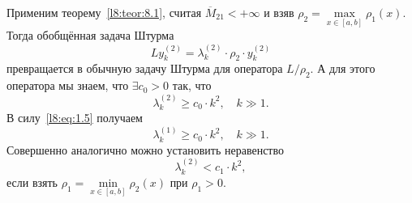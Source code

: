 Применим теорему~\ref{l8:teor:8.1}, считая $\overline{M}_{21}<+\infty$ и взяв $\rho_2=\max\limits_{x\in[a,b]}\rho_1(x)$. Тогда обобщённая задача Штурма
\begin{equation*}
	L y_k^{(2)}=\lambda_{k}^{(2)}\cdot\rho_2\cdot y_k^{(2)}
\end{equation*}
превращается в обычную задачу Штурма для оператора $L/\rho_2$. А для этого оператора мы знаем, что $\exists c_0>0$ так, что 
\begin{equation*}
	\lambda_k^{(2)}\geqslant c_0\cdot k^2,\quad k\gg1.
\end{equation*}
В силу~\eqref{l8:eq:1.5} получаем
\begin{equation}\label{l8:eq:1.7}
	\lambda_k^{(1)}\geqslant c_0\cdot k^2,\quad k\gg1.
\end{equation}
Совершенно аналогично можно установить неравенство 
\begin{equation}\label{l8:eq:1.7a}
	\lambda_{k}^{(2)}<c_1\cdot k^2,\tag{\theequation a}
\end{equation}
если взять $\rho_1=\min\limits_{x\in[a,b]}\rho_2(x)$ при $\rho_1>0$.
%

